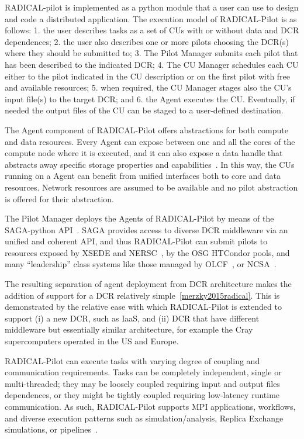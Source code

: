 \documentclass{sig-alternate}
\begin{document}
RADICAL-pilot is implemented as a python module that a user can use to design
and code a distributed application. The execution model of RADICAL-Pilot is as
follows: 1. the user describes tasks as a set of CUs with or without data and
DCR dependences; 2. the user also describes one or more pilots choosing the
DCR(s) where they should be submitted to; 3. The Pilot Manager submits each
pilot that has been described to the indicated DCR; 4. The CU Manager schedules
each CU either to the pilot indicated in the CU description or on the first
pilot with free and available resources; 5. when required, the CU Manager stages
also the CU's input file(s) to the target DCR; and 6. the Agent executes the CU.
Eventually, if needed the output files of the CU can be staged to a user-defined
destination.



The Agent component of RADICAL-Pilot offers abstractions for both compute and
data resources. Every Agent can expose between one and all the cores of the
compute node where it is executed, and it can also expose a data handle that
abstracts away specific storage properties and capabilities~\cite{luckow2010}.
In this way, the CUs running on a Agent can benefit from unified interfaces both
to core and data resources. Network resources are assumed to be available and no
pilot abstraction is offered for their abstraction.

The Pilot Manager deploys the Agents of RADICAL-Pilot by means of the
SAGA-python API~\cite{merzky2015saga}. SAGA provides access to diverse DCR
middleware via an unified and coherent API, and thus RADICAL-Pilot can submit
pilots to resources exposed by XSEDE and NERSC~\cite{nersc_url}, by the OSG
HTCondor pools, and many ``leadership'' class systems like those managed by
OLCF~\cite{olcf_url}, or NCSA~\cite{ncsa_url}.

The resulting separation of agent deployment from DCR architecture makes the
addition of support for a DCR relatively simple~\ref{merzky2015radical}. This is
demonstrated by the relative ease with which RADICAL-Pilot is extended to
support (i) a new DCR, such as IaaS, and (ii) DCR that have different middleware
but essentially similar architecture, for example the Cray supercomputers
operated in the US and Europe.

RADICAL-Pilot can execute tasks with varying degree of coupling and
communication requirements. Tasks can be completely independent, single or
multi-threaded; they may be loosely coupled requiring input and output files
dependences, or they might be tightly coupled requiring low-latency runtime
communication. As such, RADICAL-Pilot supports MPI applications, workflows, and
diverse execution patterns such as simulation/analysis, Replica Exchange
simulations, or pipelines~\cite{emdtoolkit_url}.
\end{document}
